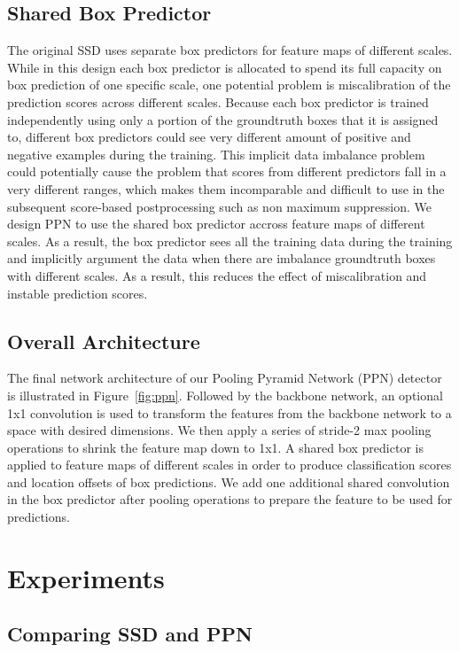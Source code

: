 \documentclass[10pt,twocolumn,letterpaper]{article}
\begin{document}
\subsection{Shared Box Predictor}
The original SSD uses separate box predictors for feature maps of different scales.
While in this design
each box predictor is allocated to spend its full capacity on box prediction of one specific scale,
one potential problem is miscalibration of the prediction scores across different scales.
Because each box predictor is trained independently using only a portion of the groundtruth boxes that it is assigned to,
different box predictors could see very different amount of positive and negative examples during the training.
This implicit data imbalance problem could potentially cause the problem that
scores from different predictors fall in a very different ranges,
which makes them incomparable and difficult to use in the subsequent score-based postprocessing such as non maximum suppression.
We design PPN to use the shared box predictor accross feature maps of different scales.
As a result, the box predictor sees all the training data during the training
and implicitly argument the data when there are imbalance groundtruth boxes with different scales.
As a result, this reduces the effect of miscalibration and instable prediction scores.


\subsection{Overall Architecture}



The final network architecture of our Pooling Pyramid Network (PPN) detector is illustrated in Figure~\ref{fig:ppn}.
Followed by the backbone network, an optional 1x1 convolution is used to transform the features from the backbone network to a space with desired dimensions.
We then apply a series of stride-2 max pooling operations to shrink the feature map down to 1x1.
A shared box predictor is applied to feature maps of different scales
in order to produce classification scores and location offsets of box predictions.
We add one additional shared convolution in the box predictor after pooling operations
to prepare the feature to be used for predictions.


\section{Experiments}

\subsection{Comparing SSD and PPN}
\end{document}
